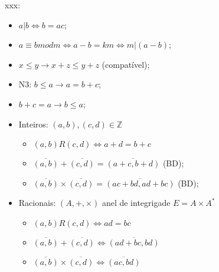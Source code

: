 \documentclass[11pt]{article}
\newcommand{\Z}{\mathbb{Z}}
\begin{document}
xxx:

\begin{itemize}
  \item $a|b \iff b=ac$;
  \item $a \equiv b mod m \iff a-b = km \iff m|(a-b)$;
  \item $x\leq y \to x+z \leq y+z$ (compatível);
  \item N3: $b\leq a \to a=b+c$;
  \item $b+c =a \to b\leq a$;
  \item Inteiros: $(a,b), (c,d) \in \Z$
    \begin{itemize}
      \item $(a,b)R(c,d)\iff a+d=b+c$
      \item $\overline{(a,b)} + \overline{(c,d)} = \overline{(a+c, b+d)}$ (BD);
      \item $\overline{(a,b)} \times \overline{(c,d)} = \overline{(ac+bd, ad+bc)}$ (BD);
    \end{itemize}
  \item Racionais: $(A, +, \times)$ anel de integrigade $E=A\times A^*$
    \begin{itemize}
      \item $(a,b)R(c,d) \iff ad=bc$
      \item $\overline{(a,b)} + \overline{(c,d)} \iff \overline{(ad+bc, bd)}$
      \item $\overline{(a,b)} \times \overline{(c,d)} \iff \overline{(ac, bd)}$
    \end{itemize}
\end{itemize}
\end{document}
